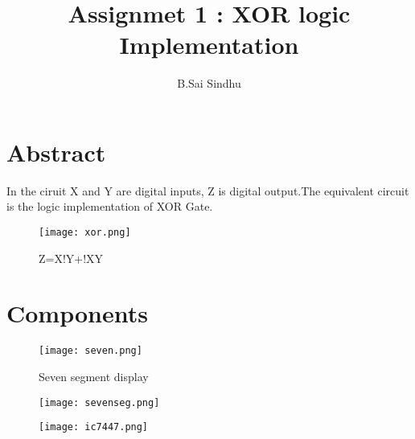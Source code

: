 \documentclass[journal,12pt,twocolumn]{IEEEtran}
\begin{document}
%

\theoremstyle{definition}
\newtheorem{theorem}{Theorem}[section]
\newtheorem{problem}{Problem}
\newtheorem{proposition}{Proposition}[section]
\newtheorem{lemma}{Lemma}[section]
\newtheorem{corollary}[theorem]{Corollary}
\newtheorem{example}{Example}[section]
\newtheorem{definition}{Definition}[section]
\newcommand{\BEQA}{\begin{eqnarray}}
\newcommand{\EEQA}{\end{eqnarray}}
\newcommand{\define}{\stackrel{\triangle}{=}}
\vspace{3cm}
\title{ 
Assignmet 1 : XOR logic Implementation
}

\author{B.Sai Sindhu}


\maketitle
\tableofcontents
\bigskip
%
\section{Abstract}

In the ciruit X and Y are digital inputs, Z is digital output.The equivalent circuit is the logic implementation of XOR Gate.
\begin{figure}[h]
    \centering
    \texttt{[image: xor.png]}
    \caption{Z=X!Y+!XY}
    \label{fig:circuit}
\end{figure}
\section{\textbf{Components}}

\begin{table}[!h]
\centering
%
%
\caption{}
\label{table:7447_disp}
\end{table}
\begin{figure}
    \centering
    \texttt{[image: seven.png]}
    \caption{Seven segment display}
    \label{fig:my_label}
\end{figure}
\begin{figure}
    \centering
    \texttt{[image: sevenseg.png]}
    \caption{}
    \label{fig:my_label}
\end{figure}
\begin{figure}
    \centering
    \texttt{[image: ic7447.png]}
    \caption{}
    \label{fig:my_label}
\end{figure}
\end{document}
